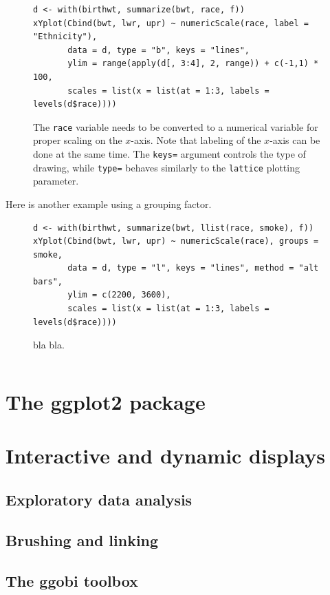 \documentclass[a4paper,twoside]{book}
\newcounter{fig}
\newcommand{\img}[1]{\texttt{[image: \#1]}\stepcounter{fig}}
\renewcommand{\texttt}[1]{\lstinline{#1}}
\begin{document}

\begin{figure}[H]
\begin{lstlisting}
d <- with(birthwt, summarize(bwt, race, f))
xYplot(Cbind(bwt, lwr, upr) ~ numericScale(race, label = "Ethnicity"), 
       data = d, type = "b", keys = "lines", 
       ylim = range(apply(d[, 3:4], 2, range)) + c(-1,1) * 100, 
       scales = list(x = list(at = 1:3, labels = levels(d$race))))
\end{lstlisting}
  \fcapside[\FBwidth] {\img{figs_lattice-crop}}
  {\caption*{The \texttt{race} variable needs to be converted to a numerical
      variable for proper scaling on the $x$-axis. Note that labeling of the
      $x$-axis can be done at the same time. The \texttt{keys=} argument
      controls the type of drawing, while \texttt{type=} behaves similarly
      to the \texttt{lattice} plotting parameter.}} 
\end{figure}


Here is another example using a grouping factor.

\begin{figure}[H]
\begin{lstlisting}
d <- with(birthwt, summarize(bwt, llist(race, smoke), f))
xYplot(Cbind(bwt, lwr, upr) ~ numericScale(race), groups = smoke, 
       data = d, type = "l", keys = "lines", method = "alt bars", 
       ylim = c(2200, 3600), 
       scales = list(x = list(at = 1:3, labels = levels(d$race))))
\end{lstlisting}
  \fcapside[\FBwidth] {\img{figs_lattice-crop}}
  {\caption*{bla bla.}} 
\end{figure}

\begin{verbatim}
\end{verbatim}

\chapter{The ggplot2 package}


\chapter{Interactive and dynamic displays}

\section{Exploratory data analysis}

\section{Brushing and linking}

\section{The ggobi toolbox}


\appendix
\backmatter

\printindex
\end{document}
